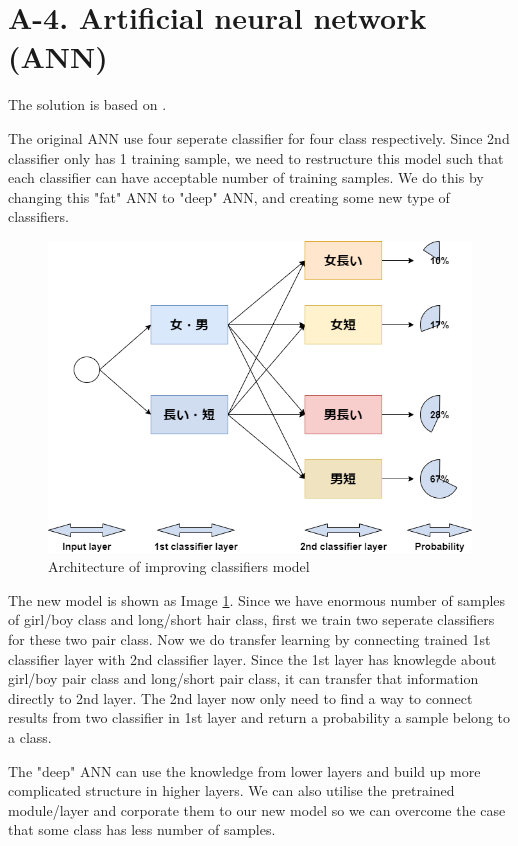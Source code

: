 \section*{A-4. Artificial neural network (ANN)}

The solution is based on \cite{Le2021}.

The original ANN use four seperate classifier for four class respectively. Since 2nd classifier only has 1 training sample, we need to restructure this model such that each classifier can have acceptable number of training samples. We do this by changing this "fat" ANN to "deep" ANN, and creating some new type of classifiers.

\begin{figure}[ht!]
	\includegraphics[scale=0.7]{./Images/ANN}
	\caption{Architecture of improving classifiers model}
	\label{fig:ANN1}
\end{figure}

The new model is shown as Image \ref{fig:ANN1}. Since we have enormous number of samples of girl/boy class and long/short hair class, first we train two seperate classifiers for these two pair class. Now we do transfer learning by connecting trained 1st classifier layer with 2nd classifier layer. Since the 1st layer has knowlegde about girl/boy pair class and long/short pair class, it can transfer that information directly to 2nd layer. The 2nd layer now only need to find a way to connect results from two classifier in 1st layer and return a probability a sample belong to a class.

The "deep" ANN can use the knowledge from lower layers and build up more complicated structure in higher layers. We can also utilise the pretrained module/layer and corporate them to our new model so we can overcome the case that some class has less number of samples.